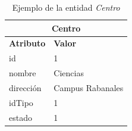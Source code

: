 \begin{itemize}
    \begin{table}[H]
    \centering
        \begin{tabular}{ |p{6cm}||p{6cm}|  }
             \hline
                \multicolumn{2}{|c|}{\textbf{Centro}} \\
             \hline
                 \textbf{Atributo} & \textbf{Valor} \\
             \hline
                 id & 1 \\
             \hline
                 nombre & Ciencias \\
             \hline
                 dirección & Campus Rabanales \\
             \hline
                 idTipo & 1 \\
             \hline
                 estado & 1 \\
        \end{tabular}
        \caption{Ejemplo de la entidad \textit{Centro}}
        \label{table:T-Centro}
    \end{table}
\end{itemize}

